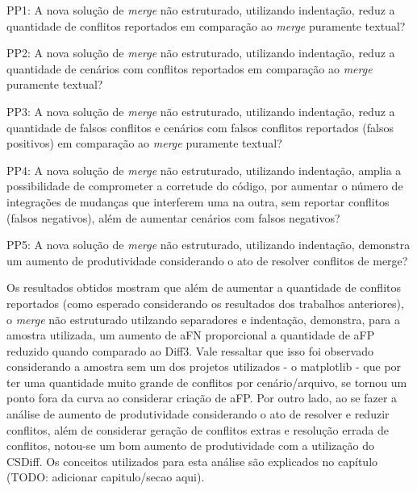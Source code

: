 \begin{compactenum}[1)]
	\item PP1: A nova solução de \emph{merge} não estruturado, utilizando indentação,
	reduz a quantidade de conflitos reportados em comparação ao \emph{merge} puramente textual?
	\item PP2: A nova solução de \emph{merge} não estruturado, utilizando indentação,
	reduz a quantidade de cenários com conflitos reportados em comparação ao \emph{merge} puramente textual?
	\item PP3: A nova solução de \emph{merge} não estruturado, utilizando indentação,
	reduz a quantidade de falsos conflitos e cenários com falsos conflitos reportados
	(falsos positivos) em comparação ao \emph{merge} puramente textual?
	\item PP4: A nova solução de \emph{merge} não estruturado, utilizando indentação,
	amplia a possibilidade de comprometer a corretude do código, por aumentar o número de
	integrações de mudanças que interferem uma na outra, sem reportar conflitos (falsos negativos),
	além de aumentar cenários com falsos negativos?
	\item PP5: A nova solução de \emph{merge} não estruturado, utilizando indentação,
	demonstra um aumento de produtividade considerando o ato de resolver conflitos de merge?
\end{compactenum}

Os resultados obtidos mostram que além de aumentar a quantidade de conflitos reportados
(como esperado considerando os resultados dos trabalhos anteriores),
o \emph{merge} não estruturado utilzando separadores e indentação, demonstra, para a amostra utilizada,
um aumento de aFN proporcional a
quantidade de aFP reduzido quando comparado ao Diff3. Vale ressaltar que isso foi observado considerando a amostra sem
um dos projetos utilizados - o matplotlib - que por ter uma quantidade muito grande de conflitos por cenário/arquivo, se tornou
um ponto fora da curva ao considerar criação de aFP.
Por outro lado, ao se fazer a análise de aumento de produtividade considerando o ato de resolver e reduzir conflitos,
além de considerar geração de conflitos extras e resolução errada de conflitos, notou-se um bom aumento
de produtividade com a utilização do CSDiff. Os conceitos utilizados para esta análise
são explicados no capítulo (TODO: adicionar capitulo/secao aqui).

